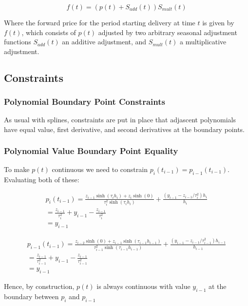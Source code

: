 \documentclass{article}
\begin{document}
\begin{equation}
    \label{eq:foward_function}
    f(t) = (p(t) + S_{add}(t))S_{mult}(t)
\end{equation}

Where the forward price for the period starting delivery at time $t$ is given by $f(t)$, which 
consists of $p(t)$ adjusted by two arbitrary seasonal adjustment functions
$S_{add}(t)$ an additive adjustment, and $S_{mult}(t)$ a multiplicative adjustment.


\subsection{Constraints}
\subsubsection{Polynomial Boundary Point Constraints}
As usual with splines, constraints are put in place that adjascent polynomials 
have equal value, first derivative, and second derivatives at the boundary points.

\subsubsection{Polynomial Value Boundary Point Equality}
To make $p(t)$ continuous we need to constrain $p_i(t_{i-1}) = p_{i-1}(t_{i-1})$. Evaluating both
of these:

\begin{eqnarray}
    \nonumber
    p_i(t_{i-1}) = \frac{z_{i-1} \sinh(\tau_i h_i) + z_i \sinh(0)}{\tau_i^2 \sinh(\tau_i h_i)}
    + \frac{(y_{i-1} - z_{i-1}/\tau_i^2) h_i }{h_i} \\
    \nonumber
    = \frac{z_{i-1}}{\tau_i^2} + y_{i-1} - \frac{z_{i-1}}{\tau_i^2} \\
    = y_{i-1}
\end{eqnarray}

\begin{eqnarray}
    \nonumber
    p_{i-1}(t_{i-1}) = \frac{z_{i-2} \sinh(0) + z_{i-1} \sinh(\tau_{i-1} h_{i-1})}{\tau_{i-1}^2 \sinh(\tau_{i-1} h_{i-1})}
    + \frac{(y_{i-1} - z_{i-1}/\tau_{i-1}^2) h_{i-1}}{h_{i-1}} \\
    \nonumber
    = \frac{z_{i-1}}{\tau_{i-1}^2} + y_{i-1} - \frac{z_{i-1}}{\tau_{i-1}^2} \\
    \nonumber
    = y_{i-1}
\end{eqnarray}

Hence, by construction, $p(t)$ is always continuous with value $y_{i-1}$ at the boundary
between $p_i$ and $p_{i - 1}$
\end{document}
